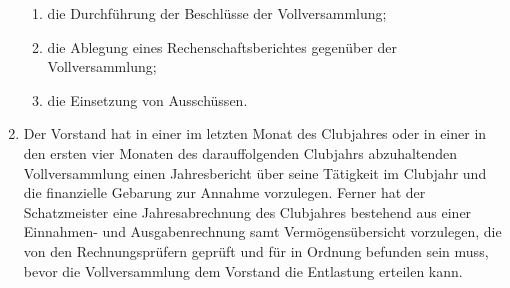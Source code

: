 \documentclass{statutclass}
\begin{document}
\begin{enumerate}
\begin{enumerate}
        \item die Durchführung der Beschlüsse der Vollversammlung;
        \item die Ablegung eines Rechenschaftsberichtes gegenüber der Vollversammlung;
        \item die Einsetzung von Ausschüssen.
    \end{enumerate}
    \item Der Vorstand hat in einer im letzten Monat des Clubjahres oder in einer in den ersten vier Monaten des darauffolgenden Clubjahrs abzuhaltenden Vollversammlung einen Jahresbericht über seine Tätigkeit im Clubjahr und die finanzielle Gebarung zur Annahme vorzulegen. Ferner hat der Schatzmeister eine Jahresabrechnung des Clubjahres bestehend aus einer Einnahmen- und Ausgabenrechnung samt Vermögensübersicht vorzulegen, die von den Rechnungsprüfern geprüft und für in Ordnung befunden sein muss, bevor die Vollversammlung dem Vorstand die Entlastung erteilen kann. 
\end{enumerate}
\end{document}
